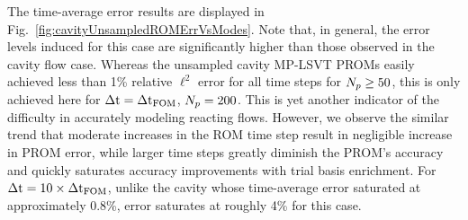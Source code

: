 The time-average error results are displayed in Fig.~\ref{fig:cavityUnsampledROMErrVsModes}. Note that, in general, the error levels induced for this case are significantly higher than those observed in the cavity flow case. Whereas the unsampled cavity MP-LSVT PROMs easily achieved less than 1\% relative $\ell^2$ error for all time steps for $N_p \ge 50$, this is only achieved here for $\Delta \text{t} = \Delta \text{t}_{\text{FOM}}$, $N_p = 200$. This is yet another indicator of the difficulty in accurately modeling reacting flows. However, we observe the similar trend that moderate increases in the ROM time step result in negligible increase in PROM error, while larger time steps greatly diminish the PROM's accuracy and quickly saturates accuracy improvements with trial basis enrichment. For $\Delta \text{t} = 10 \times \Delta \text{t}_{\text{FOM}}$, unlike the cavity whose time-average error saturated at approximately 0.8\%, error saturates at roughly 4\% for this case.

